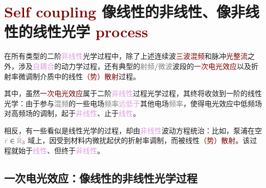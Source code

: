 \section{\textcolor{Maroon}{Self coupling} 像线性的非线性、像非线性的线性光学 \textcolor{Maroon}{process}}\label{sec:LNO_that_sim_NLO}

在所有类型的二阶\textcolor{Plum}{非线性}光学过程中，除了上述连续波\textcolor{Maroon}{三波混频}和\textcolor{NavyBlue}{脉冲}\textcolor{Maroon}{光整流}之外，涉及\textcolor{Plum}{自耦合}的动力学过程，还有典型的\textcolor{gray}{射频}/\textcolor{gray}{微波}波段的\textcolor{Maroon}{一次电光效应}以及\textcolor{PineGreen}{折射率微调制}介质中的线性\textcolor{Maroon}{（势）散射}过程。

其中，虽然\textcolor{Maroon}{一次电光效应}属于二阶\textcolor{Plum}{非线性}过程光学过程，其终将收敛到一阶的\textcolor{PineGreen}{线性光学}：由于参与\textcolor{gray}{混频}的一些电场\textcolor{gray}{频率}\textcolor{Plum}{远低于}其他电场\textcolor{gray}{频率}，使得电光效应中\textcolor{NavyBlue}{低频场}对\textcolor{NavyBlue}{高频场}的调制，起于\textcolor{Plum}{非线性}、止于\textcolor{Plum}{线性}。

相反，有一些看似是\textcolor{PineGreen}{线性光学}的过程，却由\textcolor{Plum}{非线性}波动方程统治：比如，\textcolor{NavyBlue}{泵浦}在空 $\mathcolor{gray}{\bar{r}} \in \mathcolor{gray}{\bar{\mathbb{R}}_{\textcolor{Plum}{3}}}$ 域上，因受到材料内\textcolor{NavyBlue}{微扰起伏}的\textcolor{PineGreen}{折射率}\textcolor{NavyBlue}{调制}，而被线性\textcolor{Maroon}{（势）散射}。该过程就始于\textcolor{Plum}{线性}、但终于\textcolor{Plum}{非线性}。

\subsection{一次电光效应：像线性的非线性光学过程}\label{ssec:EO=LO_that_sim_NO}

